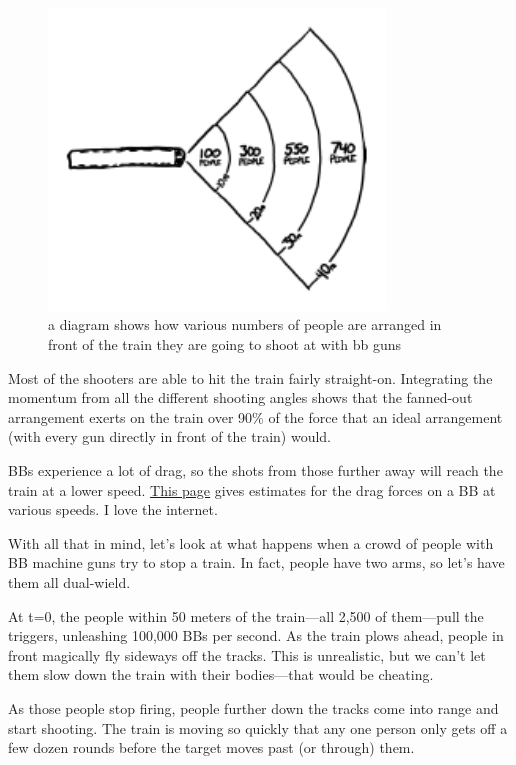 \begin{figure}[!htbp]
\centering
\includegraphics[scale=0.5, max width=0.8\textwidth]{imgs/a/18/bb_layout.png}
\caption{a diagram shows how various numbers of people are arranged in front of the train they are going to shoot at with bb guns}
\end{figure}

{Most of the shooters are able to hit the train fairly straight-on. Integrating the momentum from all the different shooting angles shows that the fanned-out arrangement exerts on the train over 90\% of the force that an ideal arrangement (with every gun directly in front of the train) would.}

{BBs experience a lot of drag, so the shots from those further away will reach the train at a lower speed. \href{http://www.swatairsoft.eu/37.html}{This page} gives estimates for the drag forces on a BB at various speeds. I love the internet.}

{With all that in mind, let’s look at what happens when a crowd of people with BB machine guns try to stop a train. In fact, people have two arms, so let’s have them all dual-wield.}

{At t=0, the people within 50 meters of the train—all 2,500 of them—pull the triggers, unleashing 100,000 BBs per second. As the train plows ahead, people in front magically fly sideways off the tracks. This is unrealistic, but we can’t let them slow down the train with their bodies—that would be cheating.}

{As those people stop firing, people further down the tracks come into range and start shooting. The train is moving so quickly that any one person only gets off a few dozen rounds before the target moves past (or through) them.}

